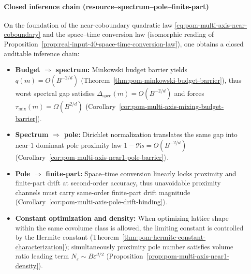 \paragraph{Closed inference chain (resource–spectrum–pole–finite-part)}
On the foundation of the near-coboundary quadratic law \eqref{eq:pom-multi-axis-near-coboundary} and the space–time conversion law (isomorphic reading of Proposition~\ref{prop:real-input-40-space-time-conversion-law}), one obtains a closed auditable inference chain:
\begin{itemize}
  \item \textbf{Budget $\Rightarrow$ spectrum:} Minkowski budget barrier yields $q(m)=O(B^{-2/d})$ (Theorem~\ref{thm:pom-minkowski-budget-barrier}), thus worst spectral gap satisfies $\Delta_{\mathrm{spec}}(m)=O(B^{-2/d})$ and forces $\tau_{\mathrm{mix}}(m)=\Omega(B^{2/d})$ (Corollary~\ref{cor:pom-multi-axis-mixing-budget-barrier}).
  \item \textbf{Spectrum $\Rightarrow$ pole:} Dirichlet normalization translates the same gap into near-$1$ dominant pole proximity law $1-\Re s=O(B^{-2/d})$ (Corollary~\ref{cor:pom-multi-axis-near1-pole-barrier}).
  \item \textbf{Pole $\Rightarrow$ finite-part:} Space–time conversion linearly locks proximity and finite-part drift at second-order accuracy, thus unavoidable proximity channels must carry same-order finite-part drift magnitude (Corollary~\ref{cor:pom-multi-axis-pole-drift-binding}).
  \item \textbf{Constant optimization and density:} When optimizing lattice shape within the same covolume class is allowed, the limiting constant is controlled by the Hermite constant (Theorem~\ref{thm:pom-hermite-constant-characterization}); simultaneously proximity pole number satisfies volume ratio leading term $N_\varepsilon\sim B\varepsilon^{d/2}$ (Proposition~\ref{prop:pom-multi-axis-near1-density}).
\end{itemize}


